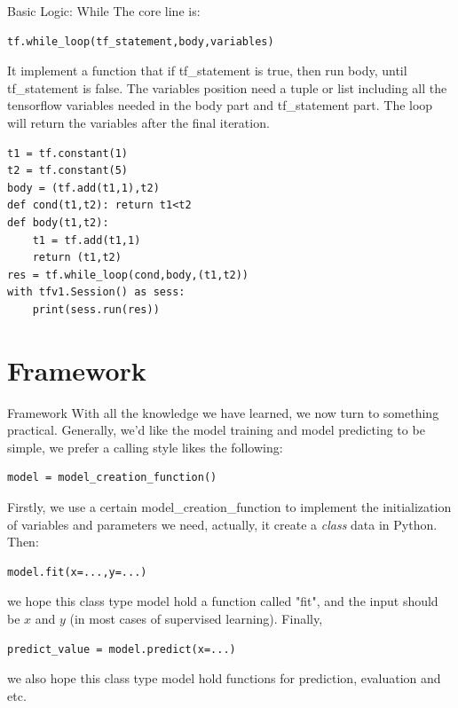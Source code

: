 \documentclass{beamer}
\begin{document}
\begin{frame}[fragile]{Basic Logic: While}
The core line is:
\begin{lstlisting}[style = Python]
tf.while_loop(tf_statement,body,variables)
\end{lstlisting}
It implement a function that if tf\_statement is true, then run body, until tf\_statement is false. The variables position need a tuple or list including all the tensorflow variables needed in the body part and tf\_statement part. The loop will return the variables after the final iteration.
\begin{example}
\begin{lstlisting}[style = Python]
t1 = tf.constant(1)
t2 = tf.constant(5)
body = (tf.add(t1,1),t2)
def cond(t1,t2): return t1<t2
def body(t1,t2): 
    t1 = tf.add(t1,1)
    return (t1,t2)
res = tf.while_loop(cond,body,(t1,t2))
with tfv1.Session() as sess:
    print(sess.run(res))
\end{lstlisting}
\end{example}
\end{frame}


\section{Framework}

\begin{frame}[fragile]{Framework}
With all the knowledge we have learned, we now turn to something practical. Generally, we'd like the model training and model predicting to be simple, we prefer a calling style likes the following:
\begin{lstlisting}[style = Python]
model = model_creation_function()
\end{lstlisting}
Firstly, we use a certain model\_creation\_function to implement the initialization of variables and parameters we need, actually, it create a \emph{class} data in Python. Then:
\begin{lstlisting}[style = Python]
model.fit(x=...,y=...)
\end{lstlisting}
we hope this class type model hold a function called "fit", and the input should be $x$ and $y$ (in most cases of supervised learning). Finally,
\begin{lstlisting}[style = Python]
predict_value = model.predict(x=...)
\end{lstlisting}
we also hope this class type model hold functions for prediction, evaluation and etc.
\end{frame}
\end{document}
